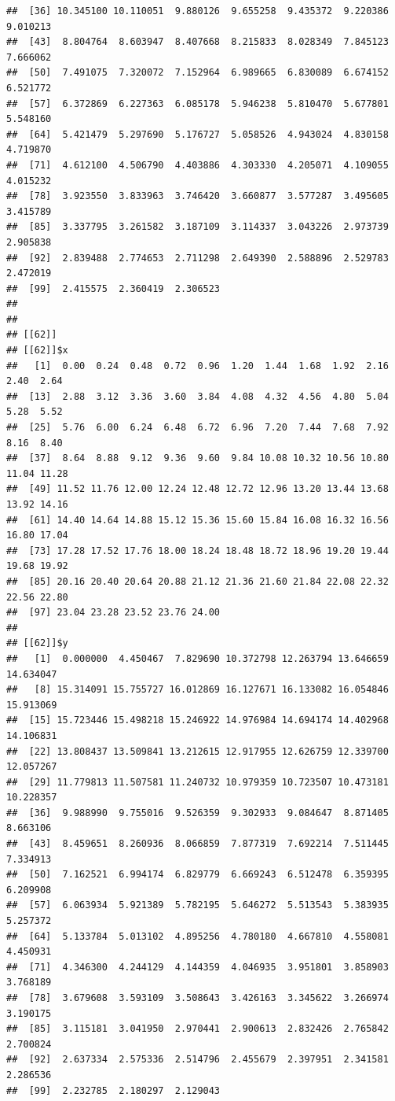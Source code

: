 \documentclass[
  ignorenonframetext,
]{beamer}
\begin{document}
\begin{frame}[fragile]{}
\begin{verbatim}
##  [36] 10.345100 10.110051  9.880126  9.655258  9.435372  9.220386  9.010213
##  [43]  8.804764  8.603947  8.407668  8.215833  8.028349  7.845123  7.666062
##  [50]  7.491075  7.320072  7.152964  6.989665  6.830089  6.674152  6.521772
##  [57]  6.372869  6.227363  6.085178  5.946238  5.810470  5.677801  5.548160
##  [64]  5.421479  5.297690  5.176727  5.058526  4.943024  4.830158  4.719870
##  [71]  4.612100  4.506790  4.403886  4.303330  4.205071  4.109055  4.015232
##  [78]  3.923550  3.833963  3.746420  3.660877  3.577287  3.495605  3.415789
##  [85]  3.337795  3.261582  3.187109  3.114337  3.043226  2.973739  2.905838
##  [92]  2.839488  2.774653  2.711298  2.649390  2.588896  2.529783  2.472019
##  [99]  2.415575  2.360419  2.306523
## 
## 
## [[62]]
## [[62]]$x
##   [1]  0.00  0.24  0.48  0.72  0.96  1.20  1.44  1.68  1.92  2.16  2.40  2.64
##  [13]  2.88  3.12  3.36  3.60  3.84  4.08  4.32  4.56  4.80  5.04  5.28  5.52
##  [25]  5.76  6.00  6.24  6.48  6.72  6.96  7.20  7.44  7.68  7.92  8.16  8.40
##  [37]  8.64  8.88  9.12  9.36  9.60  9.84 10.08 10.32 10.56 10.80 11.04 11.28
##  [49] 11.52 11.76 12.00 12.24 12.48 12.72 12.96 13.20 13.44 13.68 13.92 14.16
##  [61] 14.40 14.64 14.88 15.12 15.36 15.60 15.84 16.08 16.32 16.56 16.80 17.04
##  [73] 17.28 17.52 17.76 18.00 18.24 18.48 18.72 18.96 19.20 19.44 19.68 19.92
##  [85] 20.16 20.40 20.64 20.88 21.12 21.36 21.60 21.84 22.08 22.32 22.56 22.80
##  [97] 23.04 23.28 23.52 23.76 24.00
## 
## [[62]]$y
##   [1]  0.000000  4.450467  7.829690 10.372798 12.263794 13.646659 14.634047
##   [8] 15.314091 15.755727 16.012869 16.127671 16.133082 16.054846 15.913069
##  [15] 15.723446 15.498218 15.246922 14.976984 14.694174 14.402968 14.106831
##  [22] 13.808437 13.509841 13.212615 12.917955 12.626759 12.339700 12.057267
##  [29] 11.779813 11.507581 11.240732 10.979359 10.723507 10.473181 10.228357
##  [36]  9.988990  9.755016  9.526359  9.302933  9.084647  8.871405  8.663106
##  [43]  8.459651  8.260936  8.066859  7.877319  7.692214  7.511445  7.334913
##  [50]  7.162521  6.994174  6.829779  6.669243  6.512478  6.359395  6.209908
##  [57]  6.063934  5.921389  5.782195  5.646272  5.513543  5.383935  5.257372
##  [64]  5.133784  5.013102  4.895256  4.780180  4.667810  4.558081  4.450931
##  [71]  4.346300  4.244129  4.144359  4.046935  3.951801  3.858903  3.768189
##  [78]  3.679608  3.593109  3.508643  3.426163  3.345622  3.266974  3.190175
##  [85]  3.115181  3.041950  2.970441  2.900613  2.832426  2.765842  2.700824
##  [92]  2.637334  2.575336  2.514796  2.455679  2.397951  2.341581  2.286536
##  [99]  2.232785  2.180297  2.129043

\end{verbatim}
\end{frame}
\end{document}
